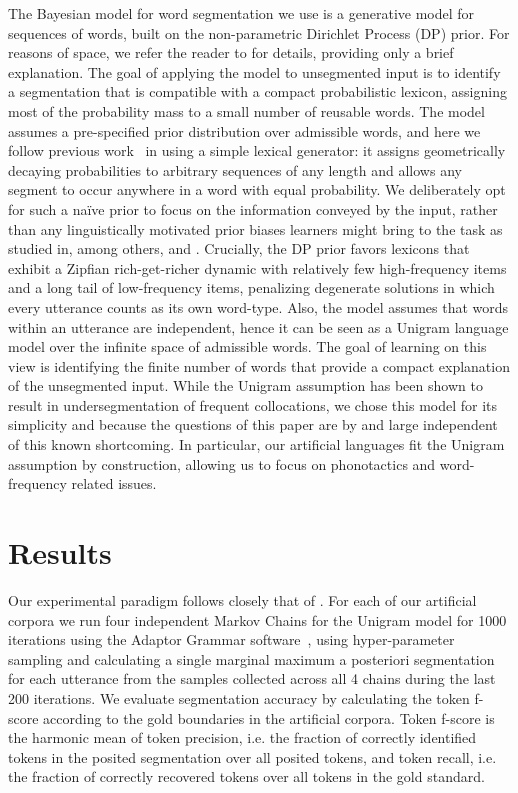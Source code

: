 \documentclass[11pt]{article}
\begin{document}
The Bayesian model for word segmentation we use is a generative model for sequences of words, built on the non-parametric Dirichlet Process (DP) prior. For reasons of space, we refer the reader to \cite{Goldwater07c} for details, providing only a brief explanation. The goal of applying the model to unsegmented input is to identify a segmentation that is compatible with a compact probabilistic lexicon, assigning most of the probability mass to a small number of reusable words. The model assumes a pre-specified prior distribution over admissible words, and here we follow previous work~\cite{Brent99a,Goldwater07c} in using a simple lexical generator: it assigns geometrically decaying probabilities to arbitrary sequences of any length and allows any segment to occur anywhere in a word with equal probability. We deliberately opt for such a na\"{i}ve prior to focus on the information conveyed by the input, rather than any linguistically motivated prior biases learners might bring to the task as studied in, among others, \cite{Johnson09a} and \cite{Borschinger12b}. Crucially, the DP prior favors lexicons that exhibit a Zipfian rich-get-richer dynamic with relatively few high-frequency items and a long tail of low-frequency items, penalizing degenerate solutions in which every utterance counts as its own word-type. Also, the model assumes that words within an utterance are independent, hence it can be seen as a Unigram language model over the infinite space of admissible words. The goal of learning on this view is identifying the finite number of words that provide a compact explanation of the unsegmented input. While the Unigram assumption has been shown to result in undersegmentation of frequent collocations, we chose this model for its simplicity and because the questions of this paper are by and large independent of this known shortcoming. In particular, our artificial languages fit the Unigram assumption by construction, allowing us to focus on phonotactics and word-frequency related issues.

\section{Results}
\vspace*{-5pt}
Our experimental paradigm follows closely that of \cite{Johnson09a}. For each of our artificial corpora we run four independent Markov Chains for the Unigram model for 1000 iterations using the Adaptor Grammar software~\cite{Johnson07c}, using hyper-parameter sampling and calculating a single marginal maximum a posteriori segmentation for each utterance from the samples collected across all 4 chains during the last 200 iterations. We evaluate segmentation accuracy by calculating the token f-score according to the gold boundaries in the artificial corpora. Token f-score is the harmonic mean of token precision, i.e. the fraction of correctly identified tokens in the posited segmentation over all posited tokens, and token recall, i.e. the fraction of correctly recovered tokens over all tokens in the gold standard. 
\end{document}
